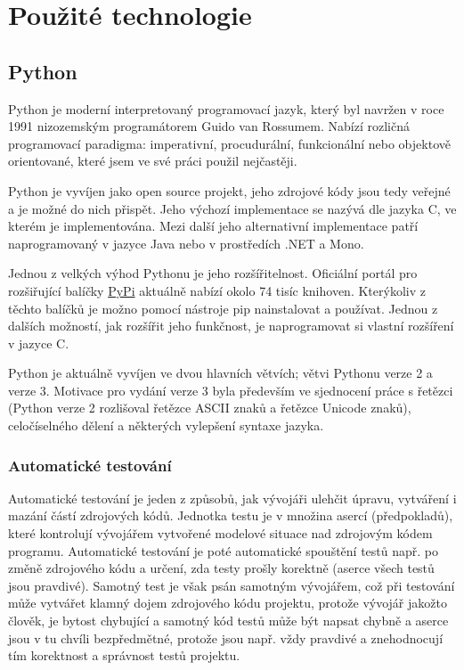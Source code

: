 \documentclass[16pt,titlepage,a4paper]{article}
\begin{document}
\section{Použité technologie}

\subsection{Python}

Python je moderní interpretovaný programovací jazyk, který byl navržen v roce 1991 nizozemským programátorem Guido van Rossumem. Nabízí rozličná programovací paradigma: imperativní, procudurální, funkcionální nebo objektově orientované, které jsem ve své práci použil nejčastěji.

Python je vyvíjen jako open source projekt, jeho zdrojové kódy jsou tedy veřejné a je možné do nich přispět. Jeho výchozí implementace se nazývá  dle jazyka C, ve kterém je implementována. Mezi další jeho alternativní implementace patří  naprogramovaný v jazyce Java nebo  v prostředích .NET a Mono.

Jednou z velkých výhod Pythonu je jeho rozšířitelnost. Oficiální 
portál pro rozšiřující balíčky 
\href{https:\/\/pypi.python.org\/pypi}{PyPi} aktuálně nabízí okolo 74 tisíc knihoven. Kterýkoliv z těchto balíčků je možno pomocí nástroje pip nainstalovat a používat. Jednou z dalších možností, jak rozšířit jeho funkčnost, je naprogramovat si vlastní rozšíření v jazyce C.

Python je aktuálně vyvíjen ve dvou hlavních větvích; větvi Pythonu verze 2 a verze 3. Motivace pro vydání verze 3 byla především ve sjednocení práce s řetězci (Python verze 2 rozlišoval řetězce ASCII znaků a řetězce Unicode znaků), celočíselného dělení a některých vylepšení syntaxe jazyka.

\subsubsection{Automatické testování}

Automatické testování je jeden z způsobů, jak vývojáři ulehčit úpravu, vytváření i mazání částí zdrojových kódů. Jednotka testu je v množina asercí (předpokladů), které kontrolují vývojářem vytvořené modelové situace nad zdrojovým kódem programu. Automatické testování je poté automatické spouštění testů např. po změně zdrojového kódu a určení, zda testy prošly korektně (aserce všech testů jsou pravdivé). Samotný test je však psán samotným vývojářem, což při testování může vytvářet klamný dojem  zdrojového kódu projektu, protože vývojář jakožto člověk, je bytost chybující a samotný kód testů může být napsat chybně a aserce jsou v tu chvíli bezpředmětné, protože jsou např. vždy pravdivé a znehodnocují tím korektnost  a správnost testů projektu.
\end{document}

